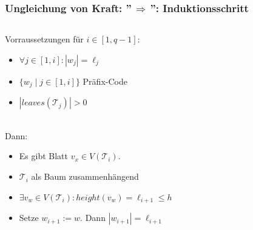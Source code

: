 \documentclass{beamer}
\begin{document}
\begin{frame}[t]
    \frametitle{Ungleichung von Kraft: ''$\,\Longrightarrow\,$'': Induktionsschritt}

    \begin{columns}
    \begin{column}{0.7\textwidth}
        Vorraussetzungen für $i \in [1,q-1]$:
        \begin{itemize}
            \setlength\itemsep{.8em}
            \item $\forall j \in [1,i]: |w_j| = \ell_j$
            \item $\{w_j \mid j \in [1,i]\}$ Präfix-Code
            \item $|leaves(\mathcal{T}_j)| > 0$
        \end{itemize}\strut\\[10pt]
        \pause
        Dann:
        \begin{itemize}
            \setlength\itemsep{.8em}
            \item Es gibt Blatt $v_x \in V(\mathcal{T}_i)$.
            \item $\mathcal{T}_i$ als Baum zusammenhängend
            \pause
            \item $\exists v_w \in V(\mathcal{T}_i): height(v_w) = \ell_{i+1} \leq h$
            \pause
            \item Setze $w_{i+1} := w$. Dann $|w_{i+1}| = \ell_{i+1}$
        \end{itemize}
    \end{column}
    \begin{column}{0.3\textwidth}\onslide
    \end{column}
    \end{columns}
\end{frame}
\end{document}
